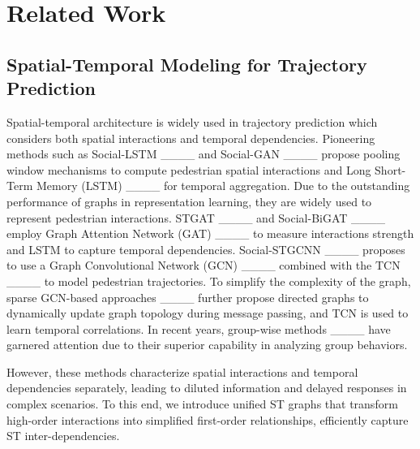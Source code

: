 \section{Related Work}
\subsection{Spatial-Temporal Modeling for Trajectory Prediction}
Spatial-temporal architecture is widely used in trajectory prediction which considers both spatial interactions and temporal dependencies. Pioneering methods such as Social-LSTM ____ and Social-GAN ____ propose pooling window mechanisms to compute pedestrian spatial interactions and Long Short-Term Memory (LSTM) ____ for temporal aggregation. Due to the outstanding performance of graphs in representation learning, they are widely used to represent pedestrian interactions. STGAT ____ and Social-BiGAT ____ employ Graph Attention Network (GAT) ____ to measure interactions strength and LSTM to capture temporal dependencies. Social-STGCNN ____ proposes to use a Graph Convolutional Network (GCN) ____ combined with the TCN ____ to model pedestrian trajectories. To simplify the complexity of the graph, sparse GCN-based approaches ____ further propose directed graphs to dynamically update graph topology during message passing, and TCN is used to learn temporal correlations. In recent years, group-wise methods ____ have garnered attention due to their superior capability in analyzing group behaviors. 

However, these methods characterize spatial interactions and temporal dependencies separately, leading to diluted information and delayed responses in complex scenarios. To this end, we introduce unified ST graphs that transform high-order interactions into simplified first-order relationships, efficiently capture ST inter-dependencies.


